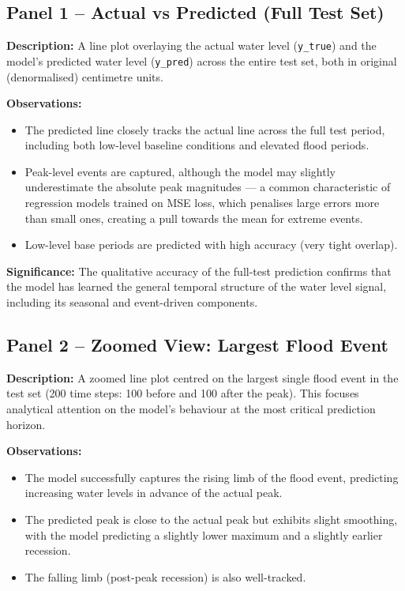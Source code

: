 \subsection{Panel 1 -- Actual vs Predicted (Full Test Set)}

\textbf{Description:} A line plot overlaying the actual water level (\texttt{y\_\allowbreak{}true}) and the model's predicted water level (\texttt{y\_\allowbreak{}pred}) across the entire test set, both in original (denormalised) centimetre units.

\textbf{Observations:}
\begin{itemize}[leftmargin=1.5em]
  \item The predicted line closely tracks the actual line across the full test period, including both low-level baseline conditions and elevated flood periods.
  \item Peak-level events are captured, although the model may slightly underestimate the absolute peak magnitudes — a common characteristic of regression models trained on MSE loss, which penalises large errors more than small ones, creating a pull towards the mean for extreme events.
  \item Low-level base periods are predicted with high accuracy (very tight overlap).
\end{itemize}

\textbf{Significance:} The qualitative accuracy of the full-test prediction confirms that the model has learned the general temporal structure of the water level signal, including its seasonal and event-driven components.

\subsection{Panel 2 -- Zoomed View: Largest Flood Event}

\textbf{Description:} A zoomed line plot centred on the largest single flood event in the test set (200 time steps: 100 before and 100 after the peak). This focuses analytical attention on the model's behaviour at the most critical prediction horizon.

\textbf{Observations:}
\begin{itemize}[leftmargin=1.5em]
  \item The model successfully captures the rising limb of the flood event, predicting increasing water levels in advance of the actual peak.
  \item The predicted peak is close to the actual peak but exhibits slight smoothing, with the model predicting a slightly lower maximum and a slightly earlier recession.
  \item The falling limb (post-peak recession) is also well-tracked.
\end{itemize}

